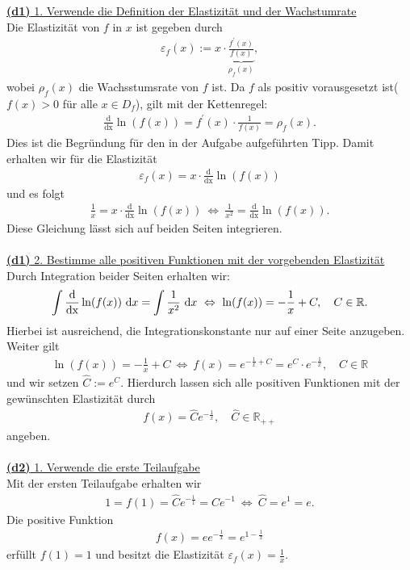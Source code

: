 \underline{\textbf{(d1)} 1. Verwende die Definition der Elastizität und der Wachstumrate}\\
Die Elastizität von $ f $ in $ x $ ist gegeben durch
\begin{align*}
	\varepsilon_f(x) := x \cdot \underbrace{\frac{f^\prime(x)}{f(x)}}_{\rho_f(x)},
\end{align*} 
wobei $ \rho_f(x) $ die Wachsstumsrate von $ f $ ist. 
Da $ f $ als positiv vorausgesetzt ist($ f(x) > 0$ für alle $ x \in D_f $), gilt mit der Kettenregel:
\begin{align*}
	\frac{\mathrm{d}}{\mathrm{dx}}\ln(f(x))
	=f^\prime(x) \cdot \frac{1}{f(x)} = \rho_f(x).
\end{align*}
Dies ist die Begründung für den in der Aufgabe aufgeführten Tipp. Damit erhalten wir für die Elastizität
\begin{align*}
	\varepsilon_f(x) = x \cdot \frac{\mathrm{d}}{\mathrm{dx}}\ln(f(x))
\end{align*} 
und es folgt
\begin{align*}
	\frac{1}{x} =  x \cdot \frac{\mathrm{d}}{\mathrm{dx}}\ln(f(x))
	\ \Leftrightarrow \
	\frac{1}{x^2} = \frac{\mathrm{d}}{\mathrm{dx}}\ln(f(x)).
\end{align*}
Diese Gleichung lässt sich auf beiden Seiten integrieren.\\
\\
\underline{\textbf{(d1)} 2. Bestimme alle positiven Funktionen mit der vorgebenden Elastizität}\\
Durch Integration beider Seiten erhalten wir:
\begin{align*}
	\int \frac{\mathrm{d}}{\mathrm{dx}}\ln(f(x)) \ \text{\rmfamily d} x
	=
	\int \frac{1}{x^2} \ \text{\rmfamily d} x
	\ \Leftrightarrow \
	\ln(f(x)) = - \frac{1}{x} + C, \quad C \in \mathbb{R}.
\end{align*}
Hierbei ist ausreichend, die Integrationskonstante nur auf einer Seite anzugeben. Weiter gilt
\begin{align*}
	\ln(f(x)) = - \frac{1}{x} + C
	\ \Leftrightarrow \
	f(x) = e^{-\frac{1}{x} + C} = e^C \cdot e^{-\frac{1}{x}} , \quad C \in \mathbb{R}
\end{align*}
und wir setzen $ \hat{C} := e^{C} $. Hierdurch lassen sich alle positiven Funktionen mit der gewünschten Elastizität durch
\begin{align*}
	f(x) = \hat{C} e^{-\frac{1}{x}}, \quad \hat{C} \in \mathbb{R}_{++}
\end{align*}
angeben.\\
\\
\underline{\textbf{(d2)} 1. Verwende die erste Teilaufgabe}\\
Mit der ersten Teilaufgabe erhalten wir
\begin{align*}
	1 =f(1) = \hat{C} e^{-\frac{1}{1} } = \hat{C} e^{-1}
	\ \Leftrightarrow \
	\hat{C} =e^{1} = e.
\end{align*}
Die positive Funktion
\begin{align*}
	f(x) = e e^{-\frac{1}{x}} = e^{1-\frac{1}{x}} 
\end{align*}
erfüllt $ f(1)  = 1$ und besitzt die Elastizität $ \varepsilon_f(x) = \frac{1}{x} $.

\newpage

